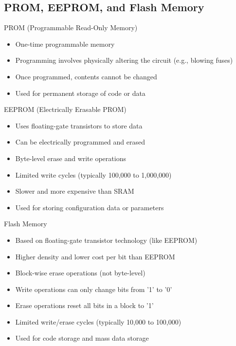 \subsection{PROM, EEPROM, and Flash Memory}


\begin{concept}{PROM (Programmable Read-Only Memory)}
\begin{itemize}
    \item One-time programmable memory
    \item Programming involves physically altering the circuit (e.g., blowing fuses)
    \item Once programmed, contents cannot be changed
    \item Used for permanent storage of code or data
\end{itemize}
\end{concept}

\begin{concept}{EEPROM (Electrically Erasable PROM)}
\begin{itemize}
    \item Uses floating-gate transistors to store data
    \item Can be electrically programmed and erased
    \item Byte-level erase and write operations
    \item Limited write cycles (typically 100,000 to 1,000,000)
    \item Slower and more expensive than SRAM
    \item Used for storing configuration data or parameters
\end{itemize}
\end{concept}

\begin{concept}{Flash Memory}
\begin{itemize}
    \item Based on floating-gate transistor technology (like EEPROM)
    \item Higher density and lower cost per bit than EEPROM
    \item Block-wise erase operations (not byte-level)
    \item Write operations can only change bits from '1' to '0'
    \item Erase operations reset all bits in a block to '1'
    \item Limited write/erase cycles (typically 10,000 to 100,000)
    \item Used for code storage and mass data storage
\end{itemize}
\end{concept}

